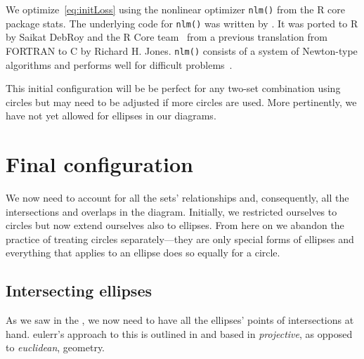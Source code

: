 \documentclass[
  oneside,
  openany,
  numbers=noendperiod,
  parskip=half,
  bibliography=totoc
]{scrbook}\usepackage[]{graphicx}\usepackage{xcolor}
\newcommand{\proglang}[1]{\textsf{#1}}
\newcommand{\pkg}[1]{{\fontseries{b}\selectfont #1}}
\newcommand{\code}[1]{\texttt{#1}}
\begin{document}
We optimize~\eqref{eq:initLoss} using the nonlinear optimizer \code{nlm()} from
the R core package \pkg{stats}. The underlying code for \code{nlm()} was
written by \citet{Schnabel_1985}. It was ported to R by Saikat DebRoy and the R
Core team~\citep{RCT_2017} from a previous translation from \proglang{FORTRAN}
to \proglang{C} by Richard H. Jones. \code{nlm()} consists of a system
of Newton-type algorithms and performs well for
difficult problems~\cite{Nash_2014}.

This initial configuration will be be perfect for any two-set combination
using circles but may need to be adjusted if more circles are used.
More pertinently, we have not yet allowed for ellipses in our diagrams.

\section{Final configuration}
\label{sec:final-config}

We now need to account for all the sets' relationships and, consequently,
all the intersections and overlaps in the diagram. Initially, we restricted
ourselves to circles but now extend ourselves also to ellipses. From here on
we abandon the practice of treating circles separately---they are only
special forms of ellipses and everything that applies to an ellipse does so
equally for a circle.

\subsection{Intersecting ellipses}
\label{sec:intersecting-ellipses}

As we saw in the , we now need to have all the ellipses'
points of intersections at hand. \pkg{eulerr}'s approach to this is outlined in
\citet{Richter-Gebert_2011} and based in \emph{projective}, as opposed to
\emph{euclidean}, geometry.
\end{document}
